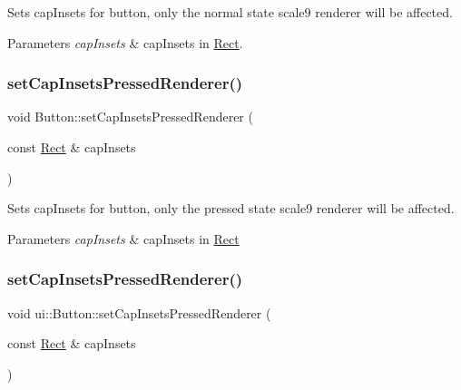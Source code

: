 Sets cap\+Insets for button, only the normal state scale9 renderer will be affected.


\begin{DoxyParams}{Parameters}
{\em cap\+Insets} & cap\+Insets in \hyperlink{classRect}{Rect}. \\
\hline
\end{DoxyParams}
\mbox{\label{classui_1_1Button_a71dc737141dc879a8413eb015ca11ebb}} 
\subsubsection{\texorpdfstring{set\+Cap\+Insets\+Pressed\+Renderer()}{setCapInsetsPressedRenderer()}\hspace{0.1cm}{\footnotesize\ttfamily [1/2]}}
{\footnotesize\ttfamily void Button\+::set\+Cap\+Insets\+Pressed\+Renderer (\begin{DoxyParamCaption}\item[{const \hyperlink{classRect}{Rect} \&}]{cap\+Insets }\end{DoxyParamCaption})}

Sets cap\+Insets for button, only the pressed state scale9 renderer will be affected.


\begin{DoxyParams}{Parameters}
{\em cap\+Insets} & cap\+Insets in \hyperlink{classRect}{Rect} \\
\hline
\end{DoxyParams}
\mbox{\label{classui_1_1Button_a2f8aec68ac1b0384653177b0de484bc3}} 
\subsubsection{\texorpdfstring{set\+Cap\+Insets\+Pressed\+Renderer()}{setCapInsetsPressedRenderer()}\hspace{0.1cm}{\footnotesize\ttfamily [2/2]}}
{\footnotesize\ttfamily void ui\+::\+Button\+::set\+Cap\+Insets\+Pressed\+Renderer (\begin{DoxyParamCaption}\item[{const \hyperlink{classRect}{Rect} \&}]{cap\+Insets }\end{DoxyParamCaption})}

